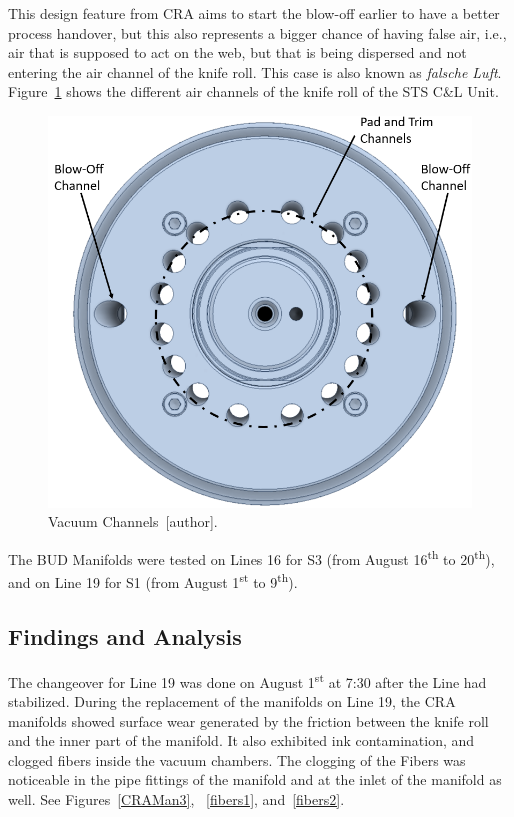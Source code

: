 This design feature from CRA aims to start the blow-off earlier to have a better process handover, but this also represents a bigger chance of having false air, i.e., air that is supposed to act on the web, but that is being dispersed and not entering the air channel of the knife roll. This case is also known as \textit{falsche Luft}. Figure~\ref{channel} shows the different air channels of the knife roll of the STS C\&L Unit.
\begin{figure}[H]
    \centering
    \includegraphics[width=0.7\linewidth]{FIGURES/Channel.png}
    \caption{Vacuum Channels~[author].}
    \label{channel}
\end{figure}

The BUD Manifolds were tested on Lines 16 for S3 (from August 16\textsuperscript{th} to 20\textsuperscript{th}), and on Line 19 for S1 (from August 1\textsuperscript{st} to 9\textsuperscript{th}). 

\subsection{Findings and Analysis}
The changeover for Line 19 was done on August 1\textsuperscript{st} at 7:30 after the Line had stabilized. During the replacement of the manifolds on Line 19, the CRA manifolds showed surface wear generated by the friction between the knife roll and the inner part of the manifold. It also exhibited ink contamination, and clogged fibers inside the vacuum chambers. The clogging of the Fibers was noticeable in the pipe fittings of the manifold and at the inlet of the manifold as well. See Figures~\ref{CRAMan3}, ~\ref{fibers1}, and~\ref{fibers2}.

